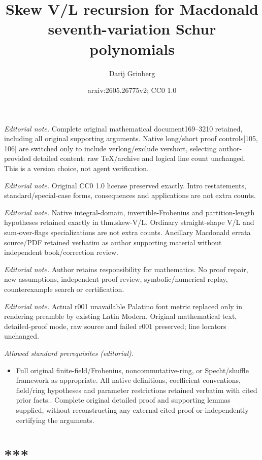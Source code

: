 \documentclass[numbers=enddot,12pt,final,onecolumn,notitlepage]{scrartcl}%
\title{Skew V/L recursion for Macdonald seventh-variation Schur polynomials}
\author{Darij Grinberg}
\date{arxiv:2605.26775v2; CC0 1.0}
\numberwithin{exer}{section}
\theoremstyle{definition}
\theoremstyle{plainsl}
\begin{document}
\maketitle
\noindent\textit{Editorial note.} Complete original mathematical document169--3210 retained, including all original supporting arguments. Native long/short proof controls[105, 106] are switched only to include verlong/exclude vershort, selecting author-provided detailed content; raw TeX/archive and logical line count unchanged. This is a version choice, not agent verification.\par\medskip
\noindent\textit{Editorial note.} Original CC0 1.0 license preserved exactly. Intro restatements, standard/special-case forms, consequences and applications are not extra counts.\par\medskip
\noindent\textit{Editorial note.} Native integral-domain, invertible-Frobenius and partition-length hypotheses retained exactly in thm.skew-V/L. Ordinary straight-shape V/L and sum-over-flags specializations are not extra counts. Ancillary Macdonald errata source/PDF retained verbatim as author supporting material without independent book/correction review.\par\medskip
\noindent\textit{Editorial note.} Author retains responsibility for mathematics. No proof repair, new assumptions, independent proof review, symbolic/numerical replay, counterexample search or certification.\par\medskip
\noindent\textit{Editorial note.} Actual r001 unavailable Palatino font metric replaced only in rendering preamble by existing Latin Modern. Original mathematical text, detailed-proof mode, raw source and failed r001 preserved; line locators unchanged.\par\medskip
\noindent\textit{Allowed standard prerequisites (editorial).}\begin{itemize}
\item Full original finite-field/Frobenius, noncommutative-ring, or Specht/shuffle framework as appropriate. All native definitions, coefficient conventions, field/ring hypotheses and parameter restrictions retained verbatim with cited prior facts.. Complete original detailed proof and supporting lemmas supplied, without reconstructing any external cited proof or independently certifying the arguments.
\end{itemize}\medskip
\section*{***}
\end{document}
